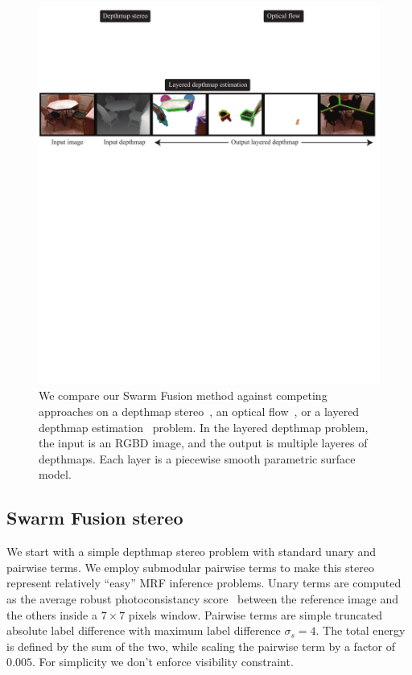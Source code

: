 %
\begin{figure}[tb]
  \includegraphics[width=\columnwidth]{figure/problem.pdf} \caption{We
    compare our Swarm Fusion method against competing approaches on a
    depthmap stereo~\cite{middle_bury_stereo}, an optical
    flow~\cite{middlebury_optical_flow}, or a layered depthmap
    estimation~\cite{layered_depthmap} problem. In the layered
    depthmap problem, the input is an RGBD image, and the output is
    multiple layeres of depthmaps. Each layer is a piecewise smooth
    parametric surface model.}\label{fig:problem}
\end{figure}



\subsection{Swarm Fusion stereo}
We start with a simple depthmap stereo problem with standard unary and
pairwise terms. We employ submodular pairwise terms to make this
stereo represent relatively ``easy'' MRF inference problems.
%
Unary terms are computed as the average robust photoconsistancy
score~\cite{woodford} between the reference image and the others
inside a $7\times 7$ pixels window.  Pairwise terms are simple
truncated absolute label difference with maximum label difference
$\sigma_s=4$. The total energy is defined by the sum of the two, while
scaling the pairwise term by a factor of $0.005$. For simplicity we
don't enforce visibility constraint.


